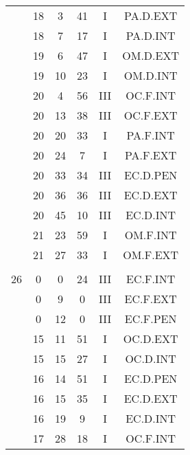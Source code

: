 \documentclass[12pt, a4paper]{article}
\begin{document}
\begin{multicols}{3}
{\begin{tabular}{c c c c c c}
	 	 	 	 & 18 & 3 & 41 & I & PA.D.EXT\\%
	 	 	 	 & 18 & 7 & 17 & I & PA.D.INT\\%
	 	 	 	 & 19 & 6 & 47 & I & OM.D.EXT\\%
	 	 	 	 & 19 & 10 & 23 & I & OM.D.INT\\%
	 	 	 	 & 20 & 4 & 56 & III & OC.F.INT\\%
	 	 	 	 & 20 & 13 & 38 & III & OC.F.EXT\\%
	 	 	 	 & 20 & 20 & 33 & I & PA.F.INT\\%
	 	 	 	 & 20 & 24 & 7 & I & PA.F.EXT\\%
	 	 	 	 & 20 & 33 & 34 & III & EC.D.PEN\\%
	 	 	 	 & 20 & 36 & 36 & III & EC.D.EXT\\%
	 	 	 	 & 20 & 45 & 10 & III & EC.D.INT\\%
	 	 	 	 & 21 & 23 & 59 & I & OM.F.INT\\%
	 	 	 	 & 21 & 27 & 33 & I & OM.F.EXT\\%
	 	 	 	 & & & & & \\%
	 	 	 	26 & 0 & 0 & 24 & III & EC.F.INT\\%
	 	 	 	 & 0 & 9 & 0 & III & EC.F.EXT\\%
	 	 	 	 & 0 & 12 & 0 & III & EC.F.PEN\\%
	 	 	 	 & 15 & 11 & 51 & I & OC.D.EXT\\%
	 	 	 	 & 15 & 15 & 27 & I & OC.D.INT\\%
	 	 	 	 & 16 & 14 & 51 & I & EC.D.PEN\\%
	 	 	 	 & 16 & 15 & 35 & I & EC.D.EXT\\%
	 	 	 	 & 16 & 19 & 9 & I & EC.D.INT\\%
	 	 	 	 & 17 & 28 & 18 & I & OC.F.INT\\%

\end{tabular}}
\end{multicols}
\end{document}
